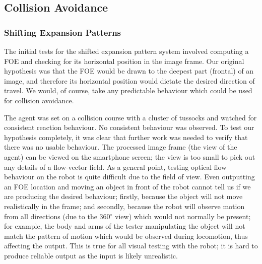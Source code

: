 \documentclass[a4paper,11pt,twoside,openright]{article}
\begin{document}
\subsection{Collision Avoidance}
\subsubsection{Shifting Expansion Patterns}
The initial tests for the shifted expansion pattern system involved computing
a FOE and checking for its horizontal position in the image frame. Our
original hypothesis was that the FOE would be drawn
to the deepest part (frontal) of an image, and therefore its horizontal position
would dictate the desired direction of travel. We would, of course, take any
predictable behaviour which could be used for collision avoidance.
\newline\par

The agent was set on a collision course with a cluster of tussocks and
watched for consistent reaction behaviour. No consistent behaviour was
observed.  To test our hypothesis completely, it was clear that
further work was needed to verify that there was no usable
behaviour. The processed image frame (the view of the agent) can be
viewed on the smartphone screen; the view is too small to pick out any
details of a flow-vector field. As a general point, testing optical
flow behaviour on the robot is quite difficult due to the field of
view. Even outputting an FOE location and moving an object in front of
the robot cannot tell us if we are producing the desired behaviour;
firstly, because the object will not move realistically in the frame;
and secondly, because the robot will observe motion from all
directions (due to the 360$^\circ$ view) which would not normally be
present; for example, the body and arms of the tester manipulating the
object will not match the pattern of motion which would be observed
during locomotion, thus affecting the output. This is true for all
visual testing with the robot; it is hard to produce reliable output
as the input is likely unrealistic.
\newline\par
\end{document}

